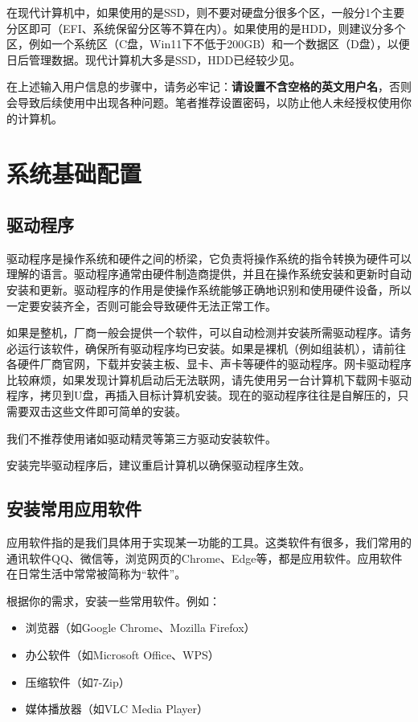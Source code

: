 在现代计算机中，如果使用的是SSD，则不要对硬盘分很多个区，一般分1个主要分区即可（EFI、系统保留分区等不算在内）。如果使用的是HDD，则建议分多个区，例如一个系统区（C盘，Win11下不低于200GB）和一个数据区（D盘），以便日后管理数据。现代计算机大多是SSD，HDD已经较少见。

在上述输入用户信息的步骤中，请务必牢记：\textbf{请设置不含空格的英文用户名}，否则会导致后续使用中出现各种问题。笔者推荐设置密码，以防止他人未经授权使用你的计算机。

\section{系统基础配置}

\subsection{驱动程序}

驱动程序是操作系统和硬件之间的桥梁，它负责将操作系统的指令转换为硬件可以理解的语言。驱动程序通常由硬件制造商提供，并且在操作系统安装和更新时自动安装和更新。驱动程序的作用是使操作系统能够正确地识别和使用硬件设备，所以一定要安装齐全，否则可能会导致硬件无法正常工作。

如果是整机，厂商一般会提供一个软件，可以自动检测并安装所需驱动程序。请务必运行该软件，确保所有驱动程序均已安装。如果是裸机（例如组装机），请前往各硬件厂商官网，下载并安装主板、显卡、声卡等硬件的驱动程序。网卡驱动程序比较麻烦，如果发现计算机启动后无法联网，请先使用另一台计算机下载网卡驱动程序，拷贝到U盘，再插入目标计算机安装。现在的驱动程序往往是自解压的，只需要双击这些文件即可简单的安装。

我们不推荐使用诸如驱动精灵等第三方驱动安装软件。

安装完毕驱动程序后，建议重启计算机以确保驱动程序生效。

\subsection{安装常用应用软件}

应用软件指的是我们具体用于实现某一功能的工具。这类软件有很多，我们常用的通讯软件QQ、微信等，浏览网页的Chrome、Edge等，都是应用软件。应用软件在日常生活中常常被简称为“软件”。

根据你的需求，安装一些常用软件。例如：
\begin{itemize}
    \item 浏览器（如Google Chrome、Mozilla Firefox）
    \item 办公软件（如Microsoft Office、WPS）
    \item 压缩软件（如7-Zip）
    \item 媒体播放器（如VLC Media Player）
\end{itemize}

